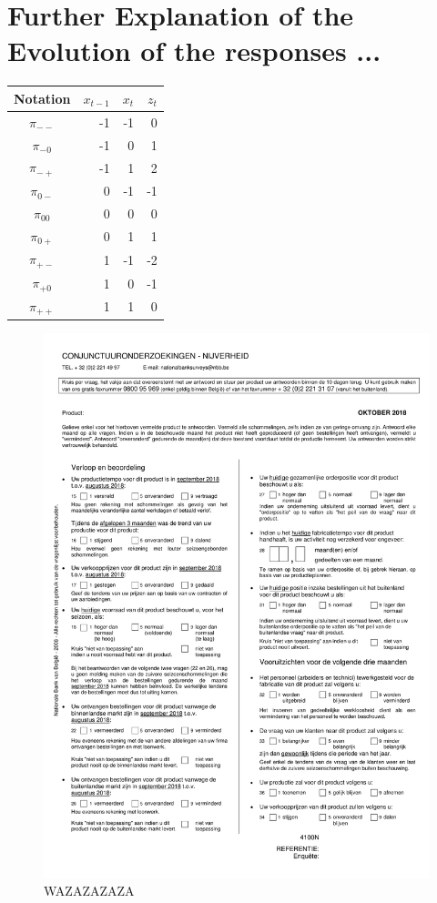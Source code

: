 \documentclass[12pt,a4paper,oneside]{book}
\begin{document}
\section*{Further Explanation of the Evolution of the responses ...}
\begin{center}
\begin{tabular}{|c|r|r|r|}
Notation    &  $x_{t-1}$ & $x_t$ & $z_t$ \\\hline
$\pi_{--}$    &  -1  & -1    & 0 \\
$\pi_{-0}$    &  -1  & 0     & 1 \\
$\pi_{-+}$    &  -1  & 1     & 2 \\
$\pi_{0-}$    &  0   & -1    & -1 \\
$\pi_{00}$    &  0   & 0     & 0 \\
$\pi_{0+}$    &  0   & 1     & 1 \\
$\pi_{+-}$    &  1   & -1    & -2 \\
$\pi_{+0}$    &  1   & 0     & -1 \\
$\pi_{++}$    &  1   & 1     & 0 \\
\end{tabular}  
\end{center}


\newpage
\begin{figure}[H]
    \centering
    \includegraphics[scale=0.75]{Images/IndustryN.pdf}
    \caption{WAZAZAZAZA}
    \label{B_pred}
\end{figure}
\end{document}
